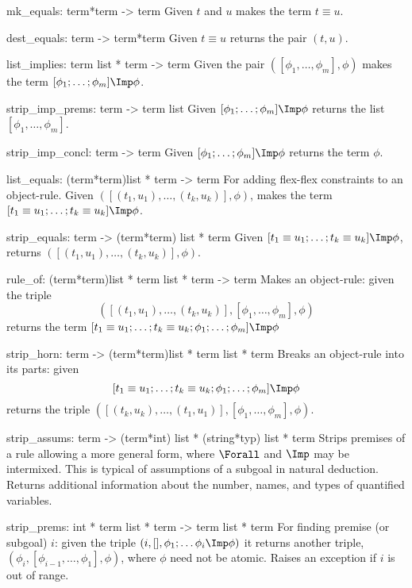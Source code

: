 \beginprog
mk_equals: term*term -> term
\endprog
Given $t$ and $u$ makes the term $t\equiv u$.

\beginprog
dest_equals: term -> term*term
\endprog
Given $t\equiv u$ returns the pair $(t,u)$.

\beginprog
list_implies: term list * term -> term
\endprog
Given the pair $([\phi_1,\ldots, \phi_m], \phi)$
makes the term \([\phi_1;\ldots; \phi_m] \Imp \phi\).

\beginprog
strip_imp_prems: term -> term list
\endprog
Given \([\phi_1;\ldots; \phi_m] \Imp \phi\)
returns the list \([\phi_1,\ldots, \phi_m]\). 

\beginprog
strip_imp_concl: term -> term
\endprog
Given \([\phi_1;\ldots; \phi_m] \Imp \phi\)
returns the term \(\phi\). 

\beginprog
list_equals: (term*term)list * term -> term
\endprog
For adding flex-flex constraints to an object-rule. 
Given $([(t_1,u_1),\ldots, (t_k,u_k)], \phi)$,
makes the term \([t_1\equiv u_1;\ldots; t_k\equiv u_k]\Imp \phi\).

\beginprog
strip_equals: term -> (term*term) list * term
\endprog
Given \([t_1\equiv u_1;\ldots; t_k\equiv u_k]\Imp \phi\),
returns $([(t_1,u_1),\ldots, (t_k,u_k)], \phi)$.

\beginprog
rule_of: (term*term)list * term list * term -> term
\endprog
Makes an object-rule: given the triple
\[ ([(t_1,u_1),\ldots, (t_k,u_k)], [\phi_1,\ldots, \phi_m], \phi) \]
returns the term
\([t_1\equiv u_1;\ldots; t_k\equiv u_k; \phi_1;\ldots; \phi_m]\Imp \phi\)

\beginprog
strip_horn: term -> (term*term)list * term list * term
\endprog
Breaks an object-rule into its parts: given
\[ [t_1\equiv u_1;\ldots; t_k\equiv u_k; \phi_1;\ldots; \phi_m] \Imp \phi \]
returns the triple
\(([(t_k,u_k),\ldots, (t_1,u_1)], [\phi_1,\ldots, \phi_m], \phi).\)

\beginprog
strip_assums: term -> (term*int) list * (string*typ) list * term
\endprog
Strips premises of a rule allowing a more general form,
where $\Forall$ and $\Imp$ may be intermixed.
This is typical of assumptions of a subgoal in natural deduction.
Returns additional information about the number, names,
and types of quantified variables.


\beginprog
strip_prems: int * term list * term -> term list * term
\endprog
For finding premise (or subgoal) $i$: given the triple
\( (i, [], \phi_1;\ldots \phi_i\Imp \phi) \)
it returns another triple,
\((\phi_i, [\phi_{i-1},\ldots, \phi_1], \phi)\),
where $\phi$ need not be atomic. Raises an exception if $i$ is out of
range.


